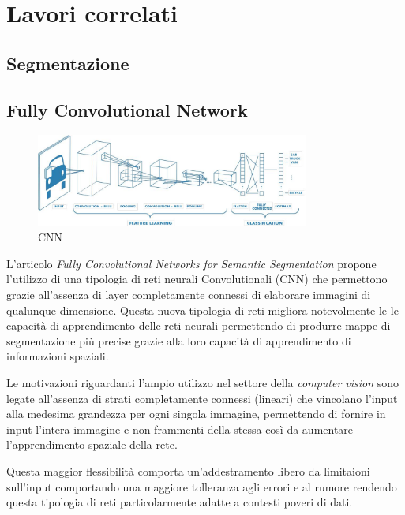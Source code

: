 
\chapter{Lavori correlati} \label{chap:related_works}


\section{Segmentazione} \label{sec:segmentazione} 


\section{Fully Convolutional Network} 
\begin{figure}[H]
  \begin{center}
    \includegraphics[width=0.8\textwidth]{Immagini/cnn.png}
  \end{center}
  \caption{CNN}
  \label{fig:cnn}
\end{figure}



\label{sec:fcn} L'articolo \textit{Fully
Convolutional Networks for Semantic Segmentation} \cite{long2015fully} propone
l'utilizzo di una tipologia di reti neurali Convolutionali (CNN) che permettono
grazie all'assenza di layer completamente connessi di elaborare immagini di
qualunque dimensione. Questa nuova tipologia di reti migliora notevolmente le
le capacità di apprendimento delle reti neurali permettendo di produrre mappe
di segmentazione più precise grazie alla loro capacità di apprendimento di
informazioni spaziali.

Le motivazioni riguardanti l'ampio utilizzo nel settore della
\textit{computer vision} sono legate all'assenza di strati completamente
connessi (lineari) che vincolano l'input alla medesima grandezza per ogni
singola immagine, permettendo di fornire in input l'intera immagine e non
frammenti della stessa così da aumentare l'apprendimento spaziale della rete.

Questa maggior flessibilità comporta un'addestramento libero da limitaioni
sull'input comportando una maggiore tolleranza agli errori e al rumore
rendendo questa tipologia di reti particolarmente adatte a contesti poveri di
dati.




